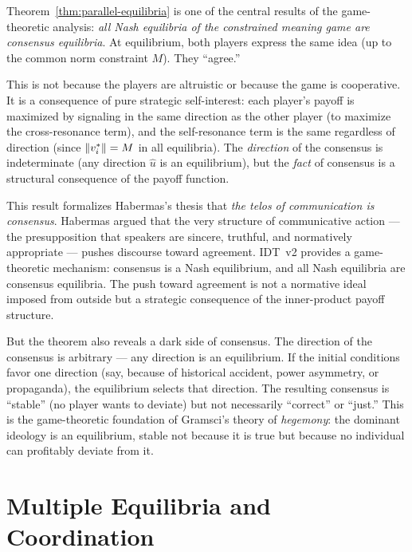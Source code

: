 \begin{interpretation}
\label{interp:consensus}
Theorem~\ref{thm:parallel-equilibria} is one of the central results of the
game-theoretic analysis: \emph{all Nash equilibria of the constrained meaning
game are consensus equilibria}. At equilibrium, both players express the same
idea (up to the common norm constraint $M$). They ``agree.''

This is not because the players are altruistic or because the game is
cooperative. It is a consequence of pure strategic self-interest: each player's
payoff is maximized by signaling in the same direction as the other player
(to maximize the cross-resonance term), and the self-resonance term is the same
regardless of direction (since $\lVert v_i^* \rVert = M$ in all equilibria). The
\emph{direction} of the consensus is indeterminate (any direction $\hat{u}$ is
an equilibrium), but the \emph{fact} of consensus is a structural consequence
of the payoff function.

This result formalizes Habermas's thesis that \emph{the telos of communication
is consensus}. Habermas argued that the very structure of communicative action
--- the presupposition that speakers are sincere, truthful, and normatively
appropriate --- pushes discourse toward agreement. IDT~v2 provides a
game-theoretic mechanism: consensus is a Nash equilibrium, and all Nash
equilibria are consensus equilibria. The push toward agreement is not a
normative ideal imposed from outside but a strategic consequence of the
inner-product payoff structure.

But the theorem also reveals a dark side of consensus. The direction of the
consensus is arbitrary --- any direction is an equilibrium. If the initial
conditions favor one direction (say, because of historical accident, power
asymmetry, or propaganda), the equilibrium selects that direction. The resulting
consensus is ``stable'' (no player wants to deviate) but not necessarily
``correct'' or ``just.'' This is the game-theoretic foundation of Gramsci's
theory of \emph{hegemony}: the dominant ideology is an equilibrium, stable
not because it is true but because no individual can profitably deviate from it.
\end{interpretation}


\section{Multiple Equilibria and Coordination}

